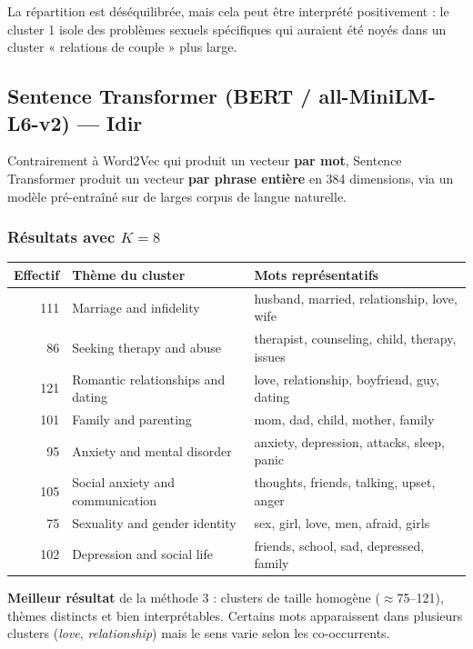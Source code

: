 \documentclass[12pt,a4paper]{article}
\begin{document}
La répartition est déséquilibrée, mais cela peut être interprété positivement : le cluster 1 isole des problèmes sexuels spécifiques qui auraient été noyés dans un cluster « relations de couple » plus large.

\subsection{Sentence Transformer (BERT / all-MiniLM-L6-v2) --- Idir}

Contrairement à Word2Vec qui produit un vecteur \textbf{par mot}, Sentence Transformer produit un vecteur \textbf{par phrase entière} en 384 dimensions, via un modèle pré-entraîné sur de larges corpus de langue naturelle.

\subsubsection*{Résultats avec $K = 8$}

\begin{center}
\begin{tabular}{rll}
\toprule
\textbf{Effectif} & \textbf{Thème du cluster} & \textbf{Mots représentatifs} \\
\midrule
111 & Marriage and infidelity          & husband, married, relationship, love, wife \\
86  & Seeking therapy and abuse        & therapist, counseling, child, therapy, issues \\
121 & Romantic relationships and dating & love, relationship, boyfriend, guy, dating \\
101 & Family and parenting             & mom, dad, child, mother, family \\
95  & Anxiety and mental disorder      & anxiety, depression, attacks, sleep, panic \\
105 & Social anxiety and communication & thoughts, friends, talking, upset, anger \\
75  & Sexuality and gender identity    & sex, girl, love, men, afraid, girls \\
102 & Depression and social life       & friends, school, sad, depressed, family \\
\bottomrule
\end{tabular}
\end{center}

\begin{remarque}
\textbf{Meilleur résultat} de la méthode 3 : clusters de taille homogène ($\approx$75--121), thèmes distincts et bien interprétables. Certains mots apparaissent dans plusieurs clusters (\textit{love}, \textit{relationship}) mais le sens varie selon les co-occurrents.
\end{remarque}
\end{document}
